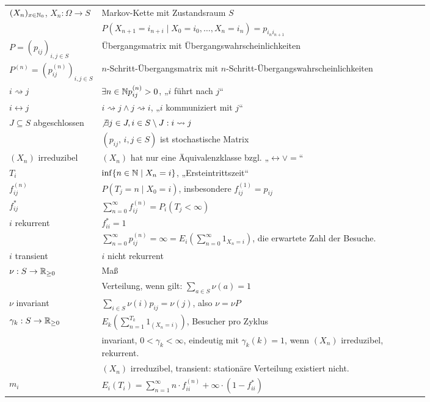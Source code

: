 \documentclass[a4paper,DIV15]{scrartcl}
\begin{document}
\begin{longtable}[h]{lp{0.8\linewidth}}
$(X_n)_{x\in\mathbb{N}_0}$, $X_n:\Omega\to S$
	& Markov-Kette mit Zustandsraum $S$\\
	& $P(X_{n+1}=i_{n+i} \mid X_0=i_0,\ldots,X_n=i_n) = p_{i_ni_{n+1}}$ \\
$P=(p_{ij})_{i,j\in S}$
	& Übergangsmatrix mit Übergangswahrscheinlichkeiten \\
$P^{(n)} = (p_{ij}^{(n)})_{i,j\in S}$
	& $n$-Schritt-Übergangsmatrix mit $n$-Schritt-Übergangswahrscheinlichkeiten\\
$i\rightsquigarrow j$
	& $\exists n\in\mathbb{N} p_{ij}^{(n)} > 0$, „$i$ führt nach $j$“\\
$i \leftrightarrow j$
	& $i\rightsquigarrow j \wedge j\rightsquigarrow i$, „$i$ kommuniziert mit $j$“ \\
$J\subseteq S$ abgeschlossen
	& $\not\exists j\in J, i\in S\setminus J: i\rightsquigarrow j$ \\
	& $(p_{ij},\, i,j\in S)$ ist stochastische Matrix \\
$(X_n)$ irreduzibel
	& $(X_n)$ hat nur eine Äquivalenzklasse bzgl. „$\leftrightarrow \vee =$“\\
$T_i$
	& $\inf\{n\in\mathbb{N}\mid X_n=i\}$, „Ersteintrittszeit“\\
$f_{ij}^{(n)}$
	& $P(T_j=n\mid X_0=i)$, insbesondere $f_{ij}^{(1)} = p_{ij}$\\
$f_{ij}^{*}$
	& $\sum_{n=0}^\infty f_{ij}^{(n)} = P_i(T_j < \infty)$\\
$i$ rekurrent
	& $f_{ii}^*=1$ \\
	& $\sum_{n=0}^\infty p_{ij}^{(n)} = \infty = E_i(\sum_{n=0}^\infty 1_{X_n=i})$, die erwartete Zahl der Besuche.\\
$i$ transient
	& $i$ nicht rekurrent \\
$\nu:S\to\mathbb{R}_{\ge0}$
	& Maß \\
	& Verteilung, wenn gilt: $\sum_{a\in S} \nu(a)=1$\\
$\nu$ invariant
	& $\sum_{i\in S} \nu(i)p_{ij} = \nu(j)$, also $\nu = \nu P$\\
$\gamma_k:S\to\mathbb{R}_{\ge0}$
	& $E_k(\sum_{n=1}^{T_k} 1_{(X_n=i)})$, Besucher pro Zyklus \\
	& invariant, $0<\gamma_k<\infty$, eindeutig mit $\gamma_k(k)=1$, wenn $(X_n)$ irreduzibel, rekurrent. \\
	& $(X_n)$ irreduzibel, transient: stationäre Verteilung existiert nicht. \\
$m_i$
	& $E_i(T_i) = \sum_{n=1}^\infty n\cdot f_{ii}^{(n)} + \infty \cdot(1-f_{ii}^*)$ \\

\end{longtable}
\end{document}
